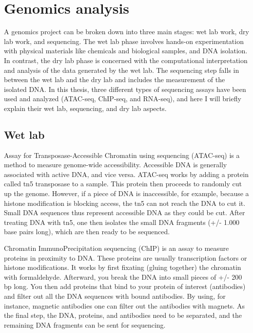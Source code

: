 \section{Genomics analysis}

A genomics project can be broken down into three main stages: wet lab work, dry lab work, and sequencing. The wet lab phase involves hands-on experimentation with physical materials like chemicals and biological samples, and DNA isolation. In contrast, the dry lab phase is concerned with the computational interpretation and analysis of the data generated by the wet lab. The sequencing step falls in between the wet lab and the dry lab and includes the measurement of the isolated DNA. In this thesis, three different types of sequencing assays have been used and analyzed (ATAC-seq, ChIP-seq, and RNA-seq), and here I will briefly explain their wet lab, sequencing, and dry lab aspects. 

\subsection{Wet lab}

Assay for Transposase-Accessible Chromatin using sequencing (ATAC-seq) is a method to measure genome-wide accessibility\cite{Buenrostro_2015}. Accessible DNA is generally associated with active DNA, and vice versa. ATAC-seq works by adding a protein called tn5 transposase to a sample. This protein then proceeds to randomly cut up the genome. However, if a piece of DNA is inaccessible, for example, because a histone modification is blocking access, the tn5 can not reach the DNA to cut it. Small DNA sequences thus represent accessible DNA as they could be cut. After treating DNA with tn5, one then isolates the small DNA fragments (+/- 1.000 base pairs long), which are then ready to be sequenced.

Chromatin ImmunoPrecipitation sequencing (ChIP) is an assay to measure proteins in proximity to DNA\cite{Robertson_2007}. These proteins are usually transcription factors or histone modifications. It works by first fixating (gluing together) the chromatin with formaldehyde. Afterward, you break the DNA into small pieces of +/- 200 bp long. You then add proteins that bind to your protein of interest (antibodies) and filter out all the DNA sequences with bound antibodies. By using, for instance, magnetic antibodies one can filter out the antibodies with magnets. As the final step, the DNA, proteins, and antibodies need to be separated, and the remaining DNA fragments can be sent for sequencing.

